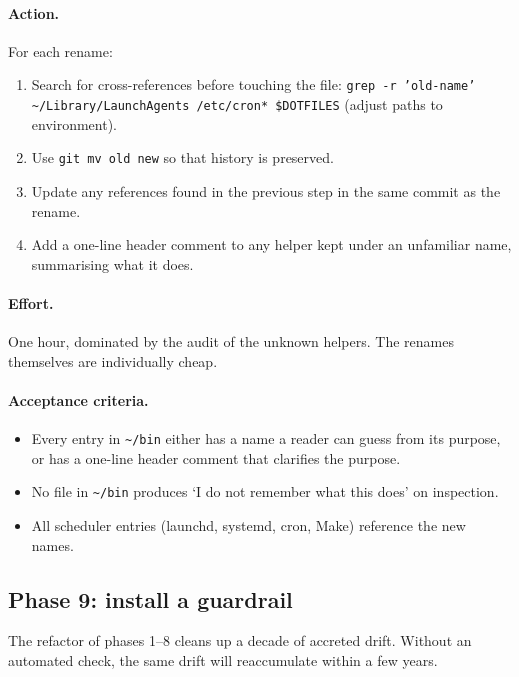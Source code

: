 \documentclass[11pt,letterpaper]{scrartcl}
\begin{document}
\paragraph{Action.} For each rename:
\begin{enumerate}
  \item Search for cross-references before touching the file:
        \texttt{grep -r 'old-name' \textasciitilde/Library/LaunchAgents
        /etc/cron* \$DOTFILES} (adjust paths to environment).
  \item Use \texttt{git mv old new} so that history is preserved.
  \item Update any references found in the previous step in the
        same commit as the rename.
  \item Add a one-line header comment to any helper kept under
        an unfamiliar name, summarising what it does.
\end{enumerate}

\paragraph{Effort.} One hour, dominated by the audit of the
unknown helpers. The renames themselves are individually cheap.

\paragraph{Acceptance criteria.}
\begin{itemize}
  \item Every entry in \texttt{\textasciitilde/bin} either has a
        name a reader can guess from its purpose, or has a
        one-line header comment that clarifies the purpose.
  \item No file in \texttt{\textasciitilde/bin} produces `I do
        not remember what this does' on inspection.
  \item All scheduler entries (launchd, systemd, cron, Make)
        reference the new names.
\end{itemize}

\subsection{Phase 9: install a guardrail}

The refactor of phases 1--8 cleans up a decade of accreted drift.
Without an automated check, the same drift will reaccumulate
within a few years.
\end{document}
